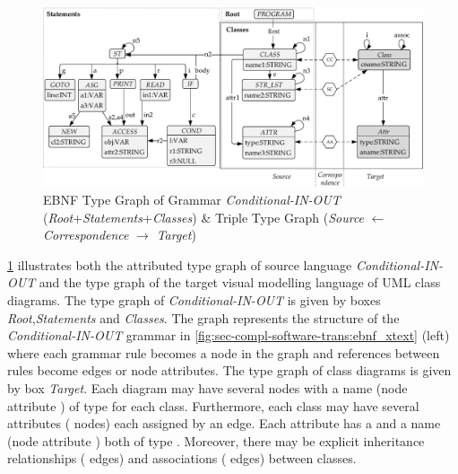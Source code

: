\begin{figure}[!tb]
\centering
\includegraphics[width=.98\textwidth]{img/software_trans/tg.pdf}
\caption{EBNF Type Graph of Grammar \textit{Conditional-IN-OUT} (\textit{Root}+\textit{Statements}+\textit{Classes}) \& Triple Type Graph (\textit{Source} $\gets$ \textit{Correspondence} $\to$ \textit{Target})}
\label{fig:sec-compl-software-trans:tg_ebnf}
\end{figure}

\begin{example}
\label{ex:sec-compl-software-trans:type_graphs}
\cref{fig:sec-compl-software-trans:tg_ebnf} illustrates both the attributed type graph of source language \textit{Conditional-IN-OUT} and the type graph of the target visual modelling language of UML class diagrams.
The type graph of \textit{Conditional-IN-OUT} is given by boxes \textit{Root},\textit{Statements} and \textit{Classes}.
The graph represents the structure of the \textit{Conditional-IN-OUT} grammar in \cref{fig:sec-compl-software-trans:ebnf_xtext} (left) where each grammar rule becomes a node in the graph and references between rules become edges or node attributes.
The type graph of class diagrams is given by box \textit{Target}.
Each diagram may have several  nodes with a name (node attribute ) of type  for each class.
Furthermore, each class may have several attributes ( nodes) each assigned by an  edge.
Each attribute has a  and a name (node attribute ) both of type .
Moreover, there may be explicit inheritance relationships ( edges) and associations ( edges) between classes.
\envEndMarker
\end{example}

